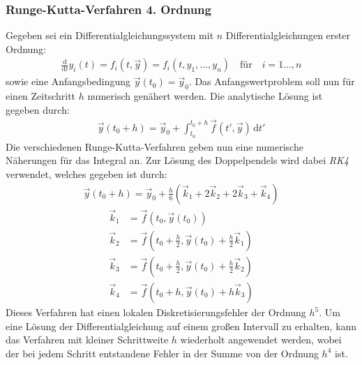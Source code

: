 \documentclass[10pt,a4paper]{article}
\begin{document}
\subsubsection{Runge-Kutta-Verfahren 4. Ordnung}
Gegeben sei ein Differentialgleichungssystem mit $n$ Differentialgleichungen erster Ordnung:
\begin{align}
\frac{\mathrm{d}}{\mathrm{d}t} y_i(t) = f_i(t, \vec{y}) = f_i(t, y_1, \dots, y_n) \quad \text{für} \quad i = 1 \dots, n
\end{align}
sowie eine Anfangsbedingung $\vec{y}(t_0) = \vec{y}_0$. Das Anfangswertproblem soll nun für einen Zeitschritt $h$ numerisch genähert werden. Die analytische Lösung ist gegeben durch:
\begin{align}
\vec{y}(t_0 + h) = \vec{y}_0 + \int_{t_0}^{t_0 + h} \vec{f}(t', \vec{y}) \,\mathrm{d}t'
\end{align}
Die verschiedenen Runge-Kutta-Verfahren geben nun eine numerische Näherungen für das Integral an. Zur Lösung des Doppelpendels wird dabei \emph{RK4} verwendet, welches gegeben ist durch:
\begin{align}
  \vec{y}(t_0 + h) = \vec{y}_0 + \frac{h}{6} (\vec{k}_1 + 2 \vec{k}_2 + 2 \vec{k}_3 + \vec{k}_4)
\end{align}
\begin{align*}
  \vec{k}_1 &= \vec{f}(t_0, \vec{y}(t_0)) \\
  \vec{k}_2 &= \vec{f}(t_0 + \frac{h}{2}, \vec{y}(t_0) + \frac{h}{2}\vec{k}_1) \\
  \vec{k}_3 &= \vec{f}(t_0 + \frac{h}{2}, \vec{y}(t_0) + \frac{h}{2}\vec{k}_2) \\
  \vec{k}_4 &= \vec{f}(t_0 + h, \vec{y}(t_0) + h \vec{k}_3)
\end{align*}
Dieses Verfahren hat einen lokalen Diskretisierungsfehler der Ordnung $h^5$. Um eine Lösung der Differentialgleichung auf einem großen Intervall zu erhalten, kann das Verfahren mit kleiner Schrittweite $h$ wiederholt angewendet werden, wobei der bei jedem Schritt entstandene Fehler in der Summe von der Ordnung $h^4$ ist.
\end{document}

